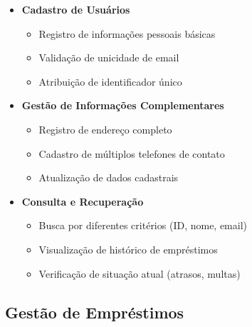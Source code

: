 \documentclass[12pt,a4paper]{article}
\begin{document}
\begin{conceptbox}
\begin{itemize}
    \item \textbf{Cadastro de Usuários}
    \begin{itemize}
        \item Registro de informações pessoais básicas
        \item Validação de unicidade de email
        \item Atribuição de identificador único
    \end{itemize}

    \item \textbf{Gestão de Informações Complementares}
    \begin{itemize}
        \item Registro de endereço completo
        \item Cadastro de múltiplos telefones de contato
        \item Atualização de dados cadastrais
    \end{itemize}

    \item \textbf{Consulta e Recuperação}
    \begin{itemize}
        \item Busca por diferentes critérios (ID, nome, email)
        \item Visualização de histórico de empréstimos
        \item Verificação de situação atual (atrasos, multas)
    \end{itemize}
\end{itemize}
\end{conceptbox}

\subsection{Gestão de Empréstimos}
\end{document}
